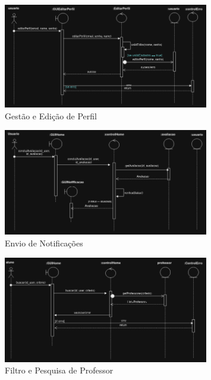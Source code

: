 \documentclass[12pt]{article}
\begin{document}
\begin{figure}[H]
    \centering
    \includegraphics[width=0.8\textwidth]{diagramas/i6-gestao-editar-perfil.png}
    \caption{Gestão e Edição de Perfil}
    \label{fig:i6-gestao-editar-perfil}
\end{figure}

\begin{figure}[H]
    \centering
    \includegraphics[width=0.8\textwidth]{diagramas/i7-enviar-notificacoes.png}
    \caption{Envio de Notificações}
    \label{fig:i7-enviar-notificacoes}
\end{figure}

\begin{figure}[H]
    \centering
    \includegraphics[width=0.8\textwidth]{diagramas/i8-filtro-pesq-professor.png}
    \caption{Filtro e Pesquisa de Professor}
    \label{fig:i8-filtro-pesq-professor}
\end{figure}
\end{document}
